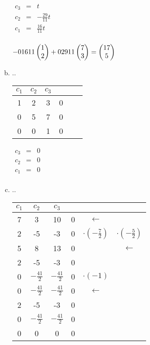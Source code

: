 \begin{enumerate}[a)]
						
						
							$\begin{array} {ccc}
								c_3 & = & t\\
								c_2 & = & -\frac{29}{11}t\\
								c_1 & = & \frac{16}{11}t\\
							\end{array}$
						
						
						
							$-\frac{16}{11} \mvect{1\\2} + \frac{29}{11} \mvect{7\\3} = \mvect{17\\5}$
						
						
				    \item ..
				    	
							\begin{tabular} {ccc|ccc}
								$c_1$ & $c_2$ & $c_3$ & & &\\
								\hline
								1 & 2 & 3 & 0 & & \\
								0 & 5 & 7 & 0 & & \\
								0 & 0 & 1 & 0 & & \\
							\end{tabular}
						
						
						
							$\begin{array} {ccc}
								c_3 & = & 0\\
								c_2 & = & 0\\
								c_1 & = & 0\\
							\end{array}$
						
						
				    \item ..
						
							\begin{tabular} {ccc|ccc}
								$c_1$ & $c_2$ & $c_3$ & & &\\
								\hline
								7 & 3 & 10 & 0 & $\leftarrow$ & \\
								2 & -5 & -3 & 0 & $\cdot(-\frac{7}{2})$ & $\cdot(-\frac{5}{2})$ \\
								5 & 8 & 13 & 0 & & $\leftarrow$ \\
								\hline
								2 & -5 & -3 & 0 & & \\
								0 & $-\frac{41}{2}$ & $-\frac{41}{2}$ & 0 & $\cdot(-1)$ & \\
								0 & $-\frac{41}{2}$ & $-\frac{41}{2}$ & 0 & $\leftarrow$ & \\
								\hline
								2 & -5 & -3 & 0 & & \\
								0 & $-\frac{41}{2}$ & $-\frac{41}{2}$ & 0 & & \\
								0 & 0 & 0 & 0 & & \\
							\end{tabular}
						

\end{enumerate}

